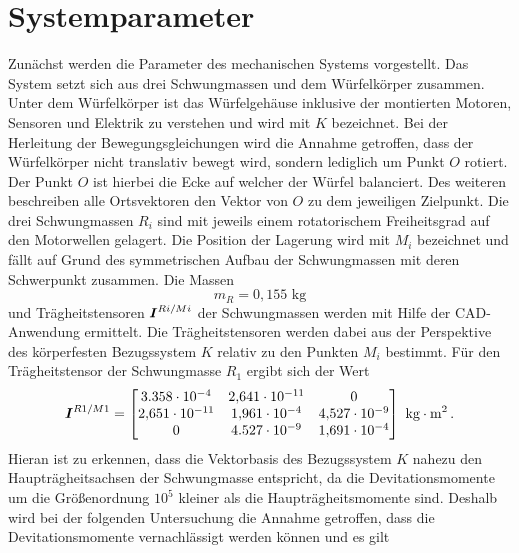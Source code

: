\section{Systemparameter}\label{TM_3D_Systemparameter}
Zunächst werden die Parameter des mechanischen Systems vorgestellt. Das System setzt sich aus drei Schwungmassen und dem Würfelkörper zusammen. Unter dem Würfelkörper ist das Würfelgehäuse inklusive der montierten Motoren, Sensoren und Elektrik zu verstehen und wird mit $K$ bezeichnet. Bei der Herleitung der Bewegungsgleichungen wird die Annahme getroffen, dass der Würfelkörper nicht translativ bewegt wird, sondern lediglich um Punkt $O$ rotiert. Der Punkt $O$ ist hierbei die Ecke auf welcher der Würfel balanciert. Des weiteren beschreiben alle Ortsvektoren den Vektor von $O$ zu dem jeweiligen Zielpunkt. Die drei Schwungmassen $R_i$ sind mit jeweils einem rotatorischem Freiheitsgrad auf den Motorwellen gelagert. Die Position der Lagerung wird mit $M_i$ bezeichnet und fällt auf Grund des symmetrischen Aufbau der Schwungmassen mit deren Schwerpunkt zusammen.
Die Massen
\begin{equation}
m_R = 0{,}155\text{ kg}
\end{equation}
und Trägheitstensoren $\boldsymbol{I}^{Ri/Mi}$ der Schwungmassen werden mit Hilfe der CAD-Anwendung ermittelt. 
Die Trägheitstensoren werden dabei aus der Perspektive des körperfesten Bezugssystem $K$ relativ zu den Punkten $M_i$ bestimmt. Für den Trägheitstensor der Schwungmasse $R_1$ ergibt sich der Wert
\begin{equation}
 \boldsymbol{I}^{R1/M1} = \begin{bmatrix}
3.358\cdot 10^{-4} & 2{,}641\cdot 10^{-11} & 0 
\\
2{,}651\cdot 10^{-11} & 1{,}961\cdot 10^{-4} & 4{,}527\cdot 10^{-9} 
\\
0 & 4.527\cdot 10^{-9} & 1{,}691\cdot 10^{-4}
\end{bmatrix} \text{ kg}\cdot \text{m}^2 \,.
\end{equation}
Hieran ist zu erkennen, dass die Vektorbasis des Bezugssystem $K$ nahezu den Haupträgheitsachsen der Schwungmasse entspricht, da die Devitationsmomente um die Größenordnung $10^{5}$ kleiner als die Haupträgheitsmomente sind. Deshalb wird bei der  
folgenden Untersuchung die Annahme getroffen, dass die Devitationsmomente vernachlässigt werden können und es gilt 
